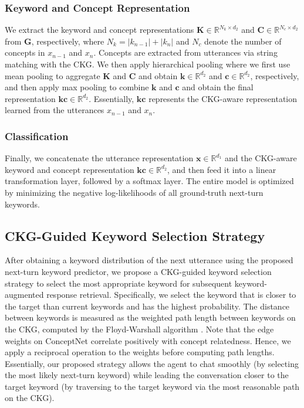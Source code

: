 \documentclass[letterpaper]{article} %
\begin{document}
\subsubsection{Keyword and Concept Representation}
We extract the keyword and concept representations $\mathbf{K} \in \mathbb{R}^{N_k \times d_2}$ and $\mathbf{C} \in \mathbb{R}^{N_c \times d_2}$ from $\mathbf{G}$, respectively, where $N_k = |k_{n-1}| + |k_{n}|$ and $N_c$ denote the number of concepts in $x_{n-1}$ and $x_{n}$. Concepts are extracted from utterances via string matching with the CKG. We then apply hierarchical pooling where we first use mean pooling to aggregate $\textbf{K}$ and $\textbf{C}$ and obtain $\textbf{k} \in \mathbb{R}^{d_2}$ and $\textbf{c} \in \mathbb{R}^{d_2}$, respectively, and then apply max pooling to combine $\textbf{k}$ and $\textbf{c}$ and obtain the final representation $\mathbf{kc} \in \mathbb{R}^{d_2}$. Essentially,  $\mathbf{kc}$ represents the CKG-aware representation learned from the utterances $x_{n-1}$ and $x_{n}$.
\subsubsection{Classification}
Finally, we concatenate the utterance representation $\mathbf{x} \in \mathbb{R}^{d_1}$ and the CKG-aware keyword and concept representation $\mathbf{kc} \in \mathbb{R}^{d_2}$, and then feed it into a linear transformation layer, followed by a softmax layer. The entire model is optimized by minimizing the negative log-likelihoods of all ground-truth next-turn keywords.

\subsection{CKG-Guided Keyword Selection Strategy}
After obtaining a keyword distribution of the next utterance using the proposed next-turn keyword predictor, we propose a CKG-guided keyword selection strategy to select the most appropriate keyword for subsequent keyword-augmented response retrieval. Specifically, we select the keyword that is closer to the target than current keywords and has the highest probability. The distance between keywords is measured as the weighted path length between keywords on the CKG, computed by the Floyd-Warshall algorithm \cite{floyd1962algorithm}. Note that the edge weights on ConceptNet correlate positively with concept relatedness. Hence, we apply a reciprocal operation to the weights before computing path lengths. Essentially, our proposed strategy allows the agent to chat smoothly (by selecting the most likely next-turn keyword) while leading the conversation closer to the target keyword (by traversing to the target keyword via the most reasonable path on the CKG).
\end{document}
